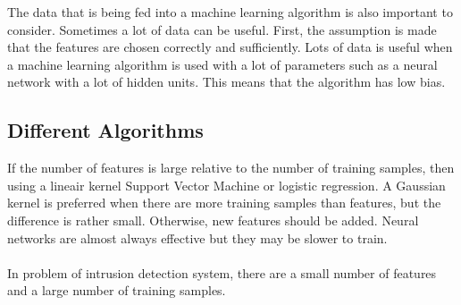 \noindent The data that is being fed into a machine learning algorithm is also important to consider. Sometimes a lot of data can be useful. First, the assumption is made that the features are chosen correctly and sufficiently. Lots of data is useful when a machine learning algorithm is used with a lot of parameters such as a neural network with a lot of hidden units. This means that the algorithm has low bias. 

\subsection{Different Algorithms}
If the number of features is large relative to the number of training samples, then using a lineair kernel Support Vector Machine or logistic regression. A Gaussian kernel is preferred when there are more training samples than features, but the difference is rather small. Otherwise, new features should be added. Neural networks are almost always effective but they may be slower to train.\\\\
In problem of intrusion detection system, there are a small number of features and a large number of training samples. 